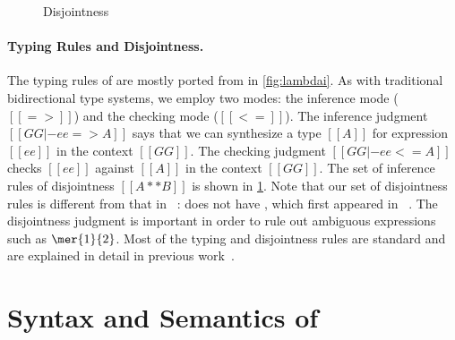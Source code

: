 \begin{figure}[t]
  \centering
  \caption{Disjointness}
  \label{fig:disjoint}
\end{figure}


\paragraph{Typing Rules and Disjointness.}

The typing rules of \namee are mostly ported from \oname in \cref{fig:lambdai}.
As with traditional bidirectional type systems, we employ two modes: the
inference mode ($[[=>]]$) and the checking mode ($[[<=]]$). The inference
judgment $[[GG |- ee => A]]$ says that we can synthesize a type $[[A]]$ for
expression $[[ee]]$ in the context $[[GG]]$. The checking judgment $[[GG |- ee <= A]]$
checks $[[ee]]$ against $[[A]]$ in the context $[[GG]]$. The set of
inference rules of disjointness $[[A ** B]]$ is shown in \cref{fig:disjoint}.
Note that our set of disjointness rules is different from that in
\oname~\citep[Figure 10]{oliveira2016disjoint}: \oname does not have
, which first appeared in \fname~\citep[Figure 3]{alpuimdisjoint}.
The disjointness judgment is
important in order to rule out ambiguous expressions such as $\mer{1}{2}$. Most
of the typing and disjointness rules are standard and are explained in detail in
previous work~\citep{oliveira2016disjoint, alpuimdisjoint}.



\section{Syntax and Semantics of \tname}
\label{sec:elaboration}

